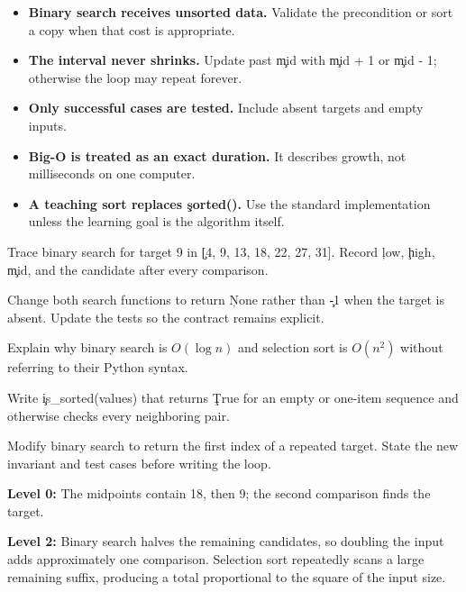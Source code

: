 
\begin{itemize}
    \item \textbf{Binary search receives unsorted data.} Validate the
          precondition or sort a copy when that cost is appropriate.
    \item \textbf{The interval never shrinks.} Update past \c{mid} with
          \c{mid + 1} or \c{mid - 1}; otherwise the loop may repeat forever.
    \item \textbf{Only successful cases are tested.} Include absent targets and
          empty inputs.
    \item \textbf{Big-O is treated as an exact duration.} It describes growth,
          not milliseconds on one computer.
    \item \textbf{A teaching sort replaces \c{sorted()}.} Use the standard
          implementation unless the learning goal is the algorithm itself.
\end{itemize}



Trace binary search for target 9 in \c{[4, 9, 13, 18, 22, 27, 31]}. Record
\c{low}, \c{high}, \c{mid}, and the candidate after every comparison.


Change both search functions to return \c{None} rather than \c{-1} when the
target is absent. Update the tests so the contract remains explicit.


Explain why binary search is $O(\log n)$ and selection sort is $O(n^2)$ without
referring to their Python syntax.


Write \c{is_sorted(values)} that returns \c{True} for an empty or one-item
sequence and otherwise checks every neighboring pair.


Modify binary search to return the first index of a repeated target. State the
new invariant and test cases before writing the loop.


\textbf{Level 0:} The midpoints contain 18, then 9; the second comparison finds
the target.

\textbf{Level 2:} Binary search halves the remaining candidates, so doubling
the input adds approximately one comparison. Selection sort repeatedly scans a
large remaining suffix, producing a total proportional to the square of the
input size.

